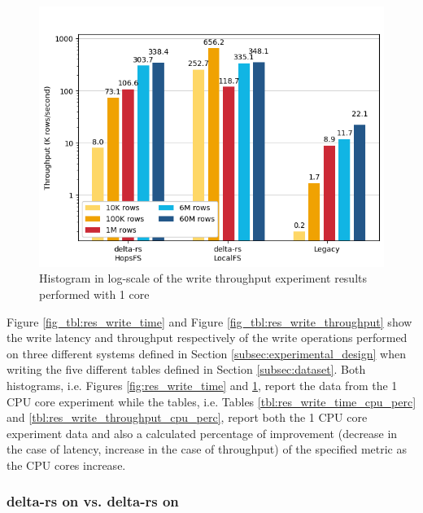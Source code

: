 \begin{figure}
\begin{minipage}[b]{\textwidth}
\begin{tabular}{c r S[table-format=4.5] S[table-format=2.2] S[table-format=2.2] S[table-format=2.2]}
            \bottomrule
        \end{tabular}
    \end{minipage}
    \begin{minipage}[b]{\textwidth}
        \includegraphics[width=\textwidth]{figures/5-results/write/write_throughput_1_core.png}
        \caption{Histogram in log-scale of the write throughput experiment results performed with 1  core}
        \label{fig:res_write_throughput}
    \end{minipage}
\end{figure}

Figure \ref{fig_tbl:res_write_time} and Figure \ref{fig_tbl:res_write_throughput} show the write latency and throughput respectively of the write operations performed on three different systems defined in Section \ref{subsec:experimental_design} when writing the five different tables defined in Section \ref{subsec:dataset}. Both histograms, i.e. Figures \ref{fig:res_write_time} and \ref{fig:res_write_throughput}, report the data from the 1 \gls{CPU} core experiment while the tables, i.e. Tables \ref{tbl:res_write_time_cpu_perc} and \ref{tbl:res_write_throughput_cpu_perc}, report both the 1 \gls{CPU} core experiment data and also a calculated percentage of improvement (decrease in the case of latency, increase in the case of throughput) of the specified metric as the \gls{CPU} cores increase.

\subsubsection*{delta-rs on  vs. delta-rs on }

